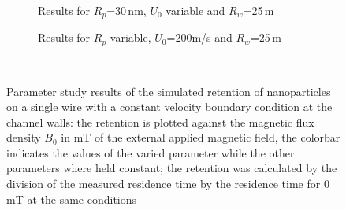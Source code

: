 \begin{figure}
\begin{subfigure}{0.49\textwidth}
                  \caption{Results for $R_{p}$=30\,nm, $U_{0}$ variable and $R_{w}$=25\,\textmu m}\label{subfig:sw_constBC_U0_var}
          \end{subfigure}\hfill
        \begin{subfigure}{0.49\textwidth}
                \flushright
                \caption{Results for $R_{p}$ variable, $U_{0}$=200\textmu m/s and $R_{w}$=25\,\textmu m}\label{subfig:sw_constBC_Rp_var}
        \end{subfigure}
        \\
        
        \caption[Parameter study results of the simulated retention of nanoparticles on a single wire with a constant velocity boundary condition at the channel walls]{Parameter study results of the simulated retention of nanoparticles on a single wire with a constant velocity boundary condition at the channel walls: the retention is plotted against the magnetic flux density $B_{0}$ in mT of the external applied magnetic field, the colorbar indicates the values of the varied parameter while the other parameters where held constant; the retention was calculated by the division of the measured residence time by the residence time for 0\,mT at the same conditions}
        \label{fig:sw_param_res_constBC}
  \end{figure}
  

